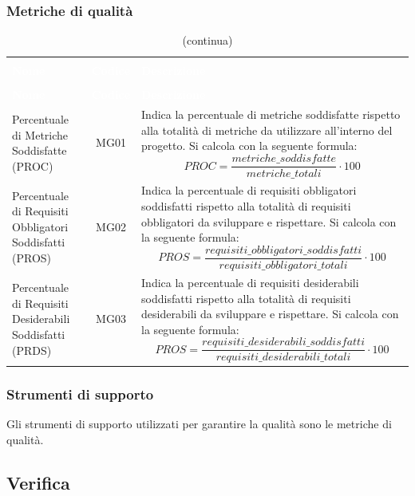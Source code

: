 \subsubsection{Metriche di qualità} \label{par:metricheGen}
\begin{longtable}{ C{4.5cm} c L{9.5cm} }
	\caption{Metriche per la qualità generale del prodotto}\\
		\textcolor{white}{\textbf{Nome}} & \textcolor{white}{\textbf{Codice}} & \centerline{\textcolor{white}{\textbf{Descrizione}}} \\
		\endfirsthead
		\caption[]{(continua)} \\
		\textcolor{white}{\textbf{Nome}} & \textcolor{white}{\textbf{Codice}} & \centerline{\textcolor{white}{\textbf{Descrizione}}} \\
		\endhead
	 Percentuale di Metriche Soddisfatte (PROC) & MG01 & Indica la percentuale di metriche soddisfatte rispetto alla totalità di metriche da utilizzare all’interno del progetto. Si calcola con la seguente formula:
		\[ PROC = \frac{metriche\_soddisfatte}{metriche\_totali}\cdot 100 \] \\
	Percentuale di Requisiti Obbligatori Soddisfatti (PROS) & MG02 & Indica la percentuale di requisiti obbligatori soddisfatti rispetto alla totalità di requisiti obbligatori da sviluppare e rispettare. Si calcola con la seguente formula:
		\[ PROS = \frac{requisiti\_obbligatori\_soddisfatti}{requisiti\_obbligatori\_totali}\cdot 100 \] \\
			Percentuale di Requisiti Desiderabili Soddisfatti (PRDS) & MG03 & Indica la percentuale di requisiti desiderabili soddisfatti rispetto alla totalità di requisiti desiderabili da sviluppare e rispettare. Si calcola con la seguente formula:
		\[ PROS = \frac{requisiti\_desiderabili\_soddisfatti}{requisiti\_desiderabili\_totali}\cdot 100 \] \\
\end{longtable}

\subsubsection{Strumenti di supporto}
Gli strumenti di supporto utilizzati per garantire la qualità sono le metriche di qualità.

\subsection{Verifica}
